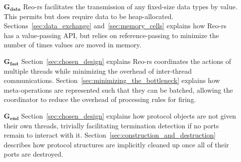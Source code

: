 \begin{enumerate}
	\item[$\boldsymbol{G_{data}}$] Reo-rs facilitates the transmission of any fixed-size data types by value. This permits but does require data to be heap-allocated. Sections~\ref{sec:data_exchange} and~\ref{sec:memory_cells} explains how Reo-rs has a value-passing API, but relies on reference-passing to minimize the number of times values are moved in memory.
	
	\item[$\boldsymbol{G_{fast}}$] Section~\ref{sec:chosen_design} explains Reo-rs coordinates the actions of multiple threads while minimizing the overhead of inter-thread communications. Section~\ref{sec:minimizing_the_bottleneck} explains how meta-operations are represented such that they can be batched, allowing the coordinator to reduce the overhead of processing rules for firing.
	
	\item[$\boldsymbol{G_{end}}$] Section~\ref{sec:chosen_design} explains how protocol objects are not given their own threads, trivially facilitating termination detection if no ports remain to interact with it. Section~\ref{sec:construction_and_destruction} describes how protocol structures are implicitly cleaned up once all of their ports are destroyed. 
\end{enumerate}